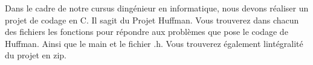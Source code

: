 Dans le cadre de notre cursus d\textquotesingle{}ingénieur en informatique, nous devons réaliser un projet de codage en C. Il s\textquotesingle{}agit du Projet Huffman. Vous trouverez dans chacun des fichiers les fonctions pour répondre aux problèmes que pose le codage de Huffman. Ainsi que le main et le fichier .h. Vous trouverez également l\textquotesingle{}intégralité du projet en zip. 